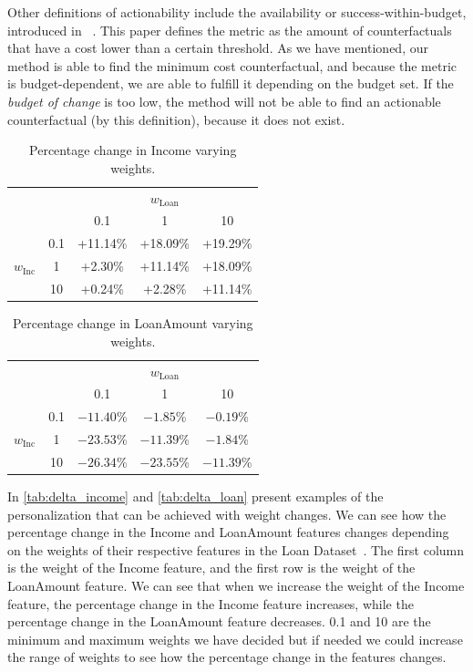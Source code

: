\documentclass[12pt]{extarticle}
\numberwithin{equation}{section}
\begin{document}
Other definitions of actionability include the availability or success-within-budget, introduced in ~\cite{ustun2019actionable}. This paper defines the metric as the amount of counterfactuals that have a cost lower than a certain threshold. As we have mentioned, our method is able to find the minimum cost counterfactual, and because the metric is budget-dependent, we are able to fulfill it depending on the budget set. If the \emph{budget of change} is too low, the method will not be able to find an actionable counterfactual (by this definition), because it does not exist.

\begin{table}[ht]
    \centering
    \begin{tabular}{cc|ccc}
             &                 & \multicolumn{3}{c}{$w_{\text{Loan}}$} \\
     & & 0.1 & 1 & 10 \\
     \cmidrule(l){1-5}
    \multirow{3}{*}{$w_{\text{Inc}}$}
             & 0.1 & +11.14\% & +18.09\% & +19.29\% \\
             & 1   &  +2.30\% & +11.14\% & +18.09\% \\
             & 10  &  +0.24\% &  +2.28\% & +11.14\% \\
    \bottomrule
\end{tabular}

    \caption{Percentage change in Income varying weights.}
    \label{tab:delta_income}
\end{table}
    
\begin{table}[ht]
    \centering
    \begin{tabular}{cc|ccc}
             &                 & \multicolumn{3}{c}{$w_{\text{Loan}}$} \\
     & & 0.1 & 1 & 10 \\
     \cmidrule(l){1-5}
    \multirow{3}{*}{$w_{\text{Inc}}$}
            & 0.1 & $-11.40$\% &  $-1.85$\% &  $-0.19$\% \\
            & 1   & $-23.53$\% & $-11.39$\% &  $-1.84$\% \\
            & 10  & $-26.34$\% & $-23.55$\% & $-11.39$\% \\
    \bottomrule
\end{tabular}

    \caption{Percentage change in LoanAmount varying weights.}
    \label{tab:delta_loan}
\end{table}

In \autoref{tab:delta_income} and \autoref{tab:delta_loan} present examples of the personalization that can be achieved with weight changes. We can see how the percentage change in the Income and LoanAmount features changes depending on the weights of their respective features in the Loan Dataset~\cite{kaggleLoan1}. The first column is the weight of the Income feature, and the first row is the weight of the LoanAmount feature. We can see that when we increase the weight of the Income feature, the percentage change in the Income feature increases, while the percentage change in the LoanAmount feature decreases. 0.1 and 10 are the minimum and maximum weights we have decided but if needed we could increase the range of weights to see how the percentage change in the features changes. 
\end{document}
